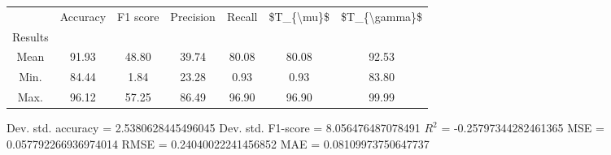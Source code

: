 \begin{tabular}{|c|c|c|c|c|c|c|}
\toprule
{} &  Accuracy &  F1 score &  Precision &  Recall &  \$T\_\{\textbackslash mu\}\$ &  \$T\_\{\textbackslash gamma\}\$ \\
Results &           &           &            &         &            &               \\
\hline
Mean    &     91.93 &     48.80 &      39.74 &   80.08 &      80.08 &         92.53 \\
Min.    &     84.44 &      1.84 &      23.28 &    0.93 &       0.93 &         83.80 \\
Max.    &     96.12 &     57.25 &      86.49 &   96.90 &      96.90 &         99.99 \\
\bottomrule
\end{tabular}

 Dev. std. accuracy = 2.5380628445496045
 Dev. std. F1-score = 8.056476487078491
 $R^2$ = -0.25797344282461365
 MSE = 0.057792266936974014
 RMSE = 0.24040022241456852
 MAE = 0.08109973750647737